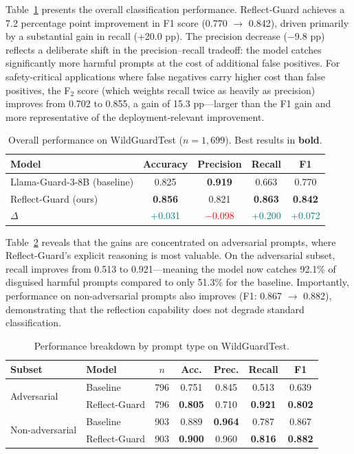\documentclass[ai,article,submit,pdftex,moreauthors]{Definitions/mdpi}
\begin{document}
Table~\ref{tab:wildguard_main} presents the overall classification performance. Reflect-Guard achieves a 7.2 percentage point improvement in F1 score (0.770 $\to$ 0.842), driven primarily by a substantial gain in recall (+20.0 pp). The precision decrease ($-$9.8 pp) reflects a deliberate shift in the precision--recall tradeoff: the model catches significantly more harmful prompts at the cost of additional false positives. For safety-critical applications where false negatives carry higher cost than false positives, the F$_2$ score (which weights recall twice as heavily as precision) improves from 0.702 to 0.855, a gain of 15.3 pp---larger than the F1 gain and more representative of the deployment-relevant improvement.

\begin{table}[H]
  \caption{Overall performance on WildGuardTest ($n = 1{,}699$). Best results in \textbf{bold}.\label{tab:wildguard_main}}
  \centering
  \begin{tabular}{lcccc}
    \toprule
    Model & Accuracy & Precision & Recall & F1 \\
    \midrule
    Llama-Guard-3-8B (baseline) & 0.825 & \textbf{0.919} & 0.663 & 0.770 \\
    Reflect-Guard (ours) & \textbf{0.856} & 0.821 & \textbf{0.863} & \textbf{0.842} \\
    \midrule
    $\Delta$ & \textcolor{teal}{+0.031} & \textcolor{red}{$-$0.098} & \textcolor{teal}{+0.200} & \textcolor{teal}{+0.072} \\
    \bottomrule
  \end{tabular}
\end{table}

Table~\ref{tab:wildguard_subset} reveals that the gains are concentrated on adversarial prompts, where Reflect-Guard's explicit reasoning is most valuable. On the adversarial subset, recall improves from 0.513 to 0.921---meaning the model now catches 92.1\% of disguised harmful prompts compared to only 51.3\% for the baseline. Importantly, performance on non-adversarial prompts also improves (F1: 0.867 $\to$ 0.882), demonstrating that the reflection capability does not degrade standard classification.

\begin{table}[H]
  \caption{Performance breakdown by prompt type on WildGuardTest.\label{tab:wildguard_subset}}
  \centering
  \begin{tabular}{llccccc}
    \toprule
    Subset & Model & $n$ & Acc. & Prec. & Recall & F1 \\
    \midrule
    \multirow{2}{*}{Adversarial}
    & Baseline & 796 & 0.751 & 0.845 & 0.513 & 0.639 \\
    & Reflect-Guard & 796 & \textbf{0.805} & 0.710 & \textbf{0.921} & \textbf{0.802} \\
    \midrule
    \multirow{2}{*}{Non-adversarial}
    & Baseline & 903 & 0.889 & \textbf{0.964} & 0.787 & 0.867 \\
    & Reflect-Guard & 903 & \textbf{0.900} & 0.960 & \textbf{0.816} & \textbf{0.882} \\
    \bottomrule
  \end{tabular}
\end{table}
\end{document}
